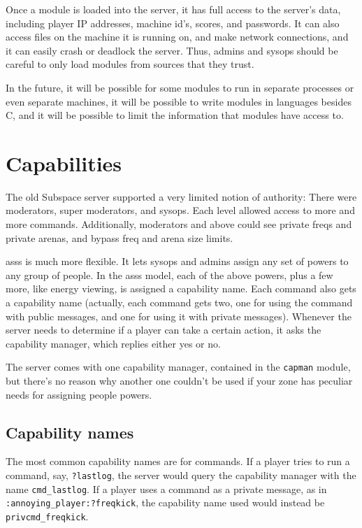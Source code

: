 \documentclass{article}
\newcommand{\asss}{asss}
\begin{document}
Once a module is loaded into the server, it has full access to the
server's data, including player IP addresses, machine id's, scores, and
passwords. It can also access files on the machine it is running on, and
make network connections, and it can easily crash or deadlock the
server. Thus, admins and sysops should be careful to only load modules
from sources that they trust.

In the future, it will be possible for some modules to run in separate
processes or even separate machines, it will be possible to write
modules in languages besides C, and it will be possible to limit the
information that modules have access to.


\section{Capabilities}

The old Subspace server supported a very limited notion of authority:
There were moderators, super moderators, and sysops. Each level allowed
access to more and more commands. Additionally, moderators and above
could see private freqs and private arenas, and bypass freq and arena
size limits.

\asss{} is much more flexible. It lets sysops and admins assign any set
of powers to any group of people. In the \asss{} model, each of the
above powers, plus a few more, like energy viewing, is assigned a
capability name. Each command also gets a capability name (actually,
each command gets two, one for using the command with public messages,
and one for using it with private messages). Whenever the server needs
to determine if a player can take a certain action, it asks the
capability manager, which replies either yes or no.

The server comes with one capability manager, contained in the
\texttt{capman} module, but there's no reason why another one couldn't
be used if your zone has peculiar needs for assigning people powers.

\subsection{Capability names}

The most common capability names are for commands. If a player tries
to run a command, say, \verb/?lastlog/, the server would query the
capability manager with the name \verb/cmd_lastlog/. If a player uses a
command as a private message, as in \verb/:annoying_player:?freqkick/,
the capability name used would instead be \verb/privcmd_freqkick/.
\end{document}
